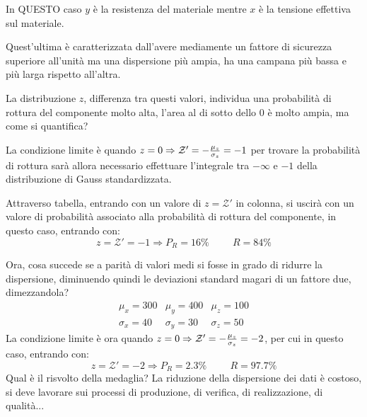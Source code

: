 \documentclass{article}
\begin{document}
\begin{adjustwidth}{2in}{}
     	
     	In QUESTO caso $y$ è la resistenza del materiale mentre $x$ è la tensione effettiva sul materiale. 
     	
     	Quest'ultima è caratterizzata dall'avere mediamente un fattore di sicurezza superiore all'unità ma una dispersione più ampia, ha una campana più bassa e più larga rispetto all'altra. 
     	
     	La distribuzione $z$, differenza tra questi valori, individua una probabilità di rottura del componente molto alta, l'area al di sotto dello $ 0 $ è molto ampia, ma come si quantifica? 
     	
     	La condizione limite è quando \(z = 0 \Rightarrow \mathcal{Z}' = -{\mu_z\over\sigma_z} = -1\) per trovare la probabilità di rottura sarà allora necessario effettuare l'integrale tra $-\infty$ e $ -1 $ della distribuzione di Gauss standardizzata. 
     	
     	Attraverso tabella, entrando con un valore di $z = \mathcal{Z}'$ in colonna, si uscirà con un valore di probabilità associato alla probabilità di rottura del componente, in questo caso, entrando con:
     	\[z = \mathcal{Z}' = - 1 \Rightarrow P_R = 16\% \hspace{1cm} R = 84\%\] 
     	
     	Ora, cosa succede se a parità di valori medi si fosse in grado di ridurre la dispersione, diminuendo quindi le deviazioni standard magari di un fattore due, dimezzandola? 
     	\[\begin{matrix}
     		\mu_x = 300 & \mu_y = 400 & \mu_z = 100 \\
     		\sigma_x = 40 & \sigma_y = 30 & \sigma_z = 50 
     	\end{matrix}\]
     	La condizione limite è ora quando \(z = 0 \Rightarrow \mathcal{Z}' = -{\mu_z\over\sigma_z} = -2\),  per cui in questo caso, entrando con:
     	\[z = \mathcal{Z}' = - 2 \Rightarrow P_R = 2.3\% \hspace{1cm} R = 97.7\%\]
     	Qual è il risvolto della medaglia? La riduzione della dispersione dei dati è costoso, si deve lavorare sui processi di produzione, di verifica, di realizzazione, di qualità... 
     	
     
	     
	     
		
		
		
		 
		
		
		
		
	
 		
 		
 		
 		

\end{adjustwidth}
\end{document}
